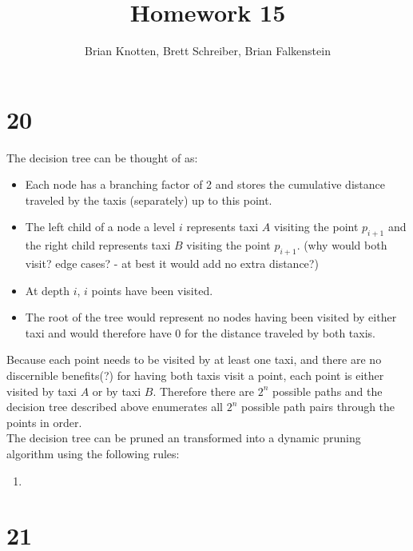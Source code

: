 \documentclass[letterpaper,notitlepage,twoside]{article}
\begin{document}
\title{Homework 15}
\author{Brian Knotten, Brett Schreiber, Brian Falkenstein}
\maketitle

\section*{20}
The decision tree can be thought of as:
\begin{itemize}
  \item Each node has a branching factor of 2 and stores the cumulative distance traveled by the taxis (separately) up to this point.
  \item The left child of a node a level $i$ represents taxi $A$ visiting the point $p_{i+1}$ and the right child represents taxi $B$ visiting the point $p_{i+1}$. (why would both visit? edge cases? - at best it would add no extra distance?)
  \item At depth $i$, $i$ points have been visited.
  \item The root of the tree would represent no nodes having been visited by either taxi and would therefore have 0 for the distance traveled by both taxis.
\end{itemize}
Because each point needs to be visited by at least one taxi, and there are no discernible benefits(?) for having both taxis visit a point, each point is either visited by taxi $A$ or by taxi $B$. Therefore there are $2^n$ possible paths and the decision tree described above enumerates all $2^n$ possible path pairs through the points in order. \\
The decision tree can be pruned an transformed into a dynamic pruning algorithm using the following rules:
\begin{enumerate}
  \item
  
\end{enumerate}
  
\section*{21}
\end{document}

